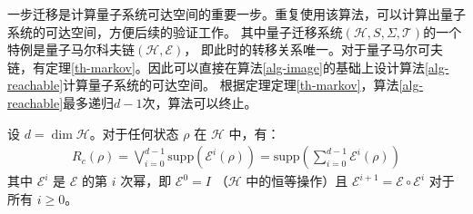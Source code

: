 一步迁移是计算量子系统可达空间的重要一步。重复使用该算法，可以计算出量子系统的可达空间，方便后续的验证工作。
其中量子迁移系统$(\mathcal{H},S,\Sigma,\mathcal{T})$的一个特例是量子马尔科夫链$(\mathcal{H},\mathcal{E})$，
即此时的转移关系唯一。对于量子马尔可夫链，有定理\ref{th-markov}。因此可以直接在算法\ref{alg-image}的基础上设计算法\ref{alg-reachable}计算量子系统的可达空间。
根据定理定理\ref{th-markov}，算法\ref{alg-reachable}最多递归$d-1$次，算法可以终止。
\begin{theorem}\citep{2021}
    \label{th-markov}
    设 $d = \dim{\mathcal{H}}$。对于任何状态 $\rho$ 在 $\mathcal{H}$ 中，有：
    \begin{align}
    R_c(\rho) = \bigvee_{i=0}^{d-1} \text{supp} (\mathcal{E}^i(\rho)) = \text{supp} \left(\sum_{i=0}^{d-1} \mathcal{E}^i (\rho)\right)
    \end{align}
    其中 $\mathcal{E}^i$ 是 $\mathcal{E}$ 的第 $i$ 次幂，即 $\mathcal{E}^0 = I$ （$\mathcal{H}$ 中的恒等操作）且 $\mathcal{E}^{i+1} = \mathcal{E} \circ \mathcal{E}^i$ 对于所有 $i \geq 0$。
\end{theorem}

